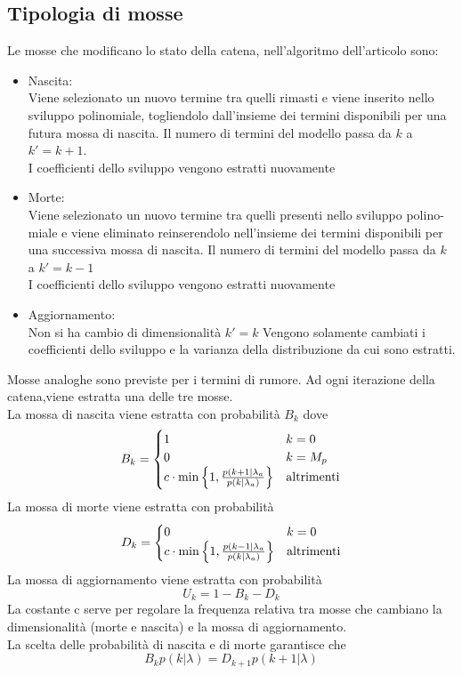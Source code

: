 \subsection{Tipologia di mosse}
Le mosse che modificano lo stato della catena, nell’algoritmo dell’articolo sono:
\begin{itemize}
\item Nascita:\\
Viene selezionato un nuovo termine tra quelli rimasti e viene inserito nello
sviluppo polinomiale, togliendolo dall’insieme dei termini disponibili per una
futura mossa di nascita. Il numero di termini del modello passa da $k$ a $k' =
k + 1$.\\
I coefficienti dello sviluppo vengono estratti nuovamente
\item Morte:\\
Viene selezionato un nuovo termine tra quelli presenti nello sviluppo polino-
miale e viene eliminato reinserendolo nell’insieme dei termini disponibili per
una successiva mossa di nascita. Il numero di termini del modello passa da $k$
a $k' = k-1$\\
I coefficienti dello sviluppo vengono estratti nuovamente
\item Aggiornamento:\\
Non si ha cambio di dimensionalità $k'=k$
Vengono solamente cambiati i coefficienti dello sviluppo e la varianza della
distribuzione da cui sono estratti.
\end{itemize}
Mosse analoghe sono previste per i termini di rumore.
Ad ogni iterazione della catena,viene estratta una delle tre mosse.\\
La mossa di nascita viene estratta con probabilità $B_k$ dove
\begin{equation}
B_k=\begin{cases}
1 & k=0\\
0 & k=M_p\\
c\cdot\min\left\lbrace 1,\frac{p(k+1|\lambda_a}{p(k|\lambda_a)}\right\rbrace & \text{altrimenti}
\end{cases}
\end{equation}
La mossa di morte viene estratta con probabilità
\begin{equation}
D_k=\begin{cases}
0 & k=0\\
c\cdot\min\left\lbrace 1,\frac{p(k-1|\lambda_a}{p(k|\lambda_a)}\right\rbrace & \text{altrimenti}
\end{cases}
\end{equation}
La mossa di aggiornamento viene estratta con probabilità
\begin{equation}
U_k=1-B_k-D_k
\end{equation}
La costante c serve per regolare la frequenza relativa tra mosse che cambiano la
dimensionalità (morte e nascita) e la mossa di aggiornamento.\\
La scelta delle probabilità di nascita e di morte garantisce che
\begin{equation}
B_k p(k|\lambda)=D_{k+1}  p(k+1|\lambda) \label{equilibr_dimensi}
\end{equation}


